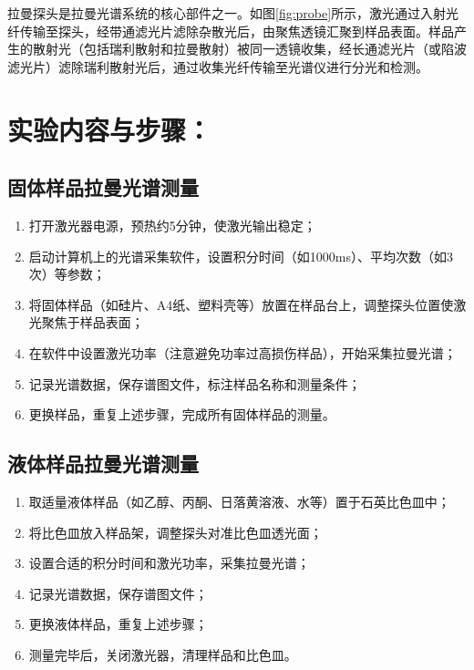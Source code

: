 拉曼探头是拉曼光谱系统的核心部件之一。如图\ref{fig:probe}所示，激光通过入射光纤传输至探头，经带通滤光片滤除杂散光后，由聚焦透镜汇聚到样品表面。样品产生的散射光（包括瑞利散射和拉曼散射）被同一透镜收集，经长通滤光片（或陷波滤光片）滤除瑞利散射光后，通过收集光纤传输至光谱仪进行分光和检测。

\section{实验内容与步骤：}

\subsection{固体样品拉曼光谱测量}

\begin{enumerate}[label=\arabic* 、, leftmargin=4em, labelsep=0pt]
    \item 打开激光器电源，预热约5分钟，使激光输出稳定；
    \item 启动计算机上的光谱采集软件，设置积分时间（如1000ms）、平均次数（如3次）等参数；
    \item 将固体样品（如硅片、A4纸、塑料壳等）放置在样品台上，调整探头位置使激光聚焦于样品表面；
    \item 在软件中设置激光功率（注意避免功率过高损伤样品），开始采集拉曼光谱；
    \item 记录光谱数据，保存谱图文件，标注样品名称和测量条件；
    \item 更换样品，重复上述步骤，完成所有固体样品的测量。
\end{enumerate}

\subsection{液体样品拉曼光谱测量}

\begin{enumerate}[label=\arabic* 、, leftmargin=4em, labelsep=0pt]
    \item 取适量液体样品（如乙醇、丙酮、日落黄溶液、水等）置于石英比色皿中；
    \item 将比色皿放入样品架，调整探头对准比色皿透光面；
    \item 设置合适的积分时间和激光功率，采集拉曼光谱；
    \item 记录光谱数据，保存谱图文件；
    \item 更换液体样品，重复上述步骤；
    \item 测量完毕后，关闭激光器，清理样品和比色皿。
\end{enumerate}

